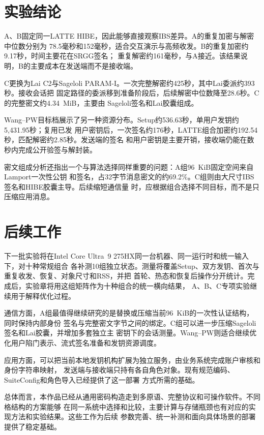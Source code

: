 \section{实验结论}

A、B固定同一LATTE HIBE，因此能够直接观察IBS差异。A的重复加密与解密中位数分别为
78.5毫秒和152毫秒，适合交互演示与高频收发。B的重复加密约9.17秒，时间主要花在SRGG签名；
重复解密约161毫秒，与A接近。该结果说明，B的主要成本在发送端而不是接收端。

C更换为Lai C2与Sageloli PARAM-I。一次完整解密约425秒，其中Lai委派约393秒。接收会话把
固定路径的委派移到准备阶段后，后续解密中位数降至28.6秒。C的完整密文约4.34~MiB，主要由
Sageloli签名和Lai胶囊组成。

Wang--PW目标档展示了另一种资源分布。Setup约536.63秒，单用户发钥约5,431.95秒；复用已发
用户密钥后，一次签名约176秒，LATTE组合加密约192.54秒，匹配解密约2.85秒。发送端的签名
和用户密钥是主要开销，接收端仍能在数秒内完成公开验签与解封装。

密文组成分析还指出一个与算法选择同样重要的问题：A组96~KiB固定空间来自Lamport一次性公钥
和签名，占32字节消息密文的约69.2\%。C组则由大尺寸IBS签名和HIBE胶囊主导。后续缩短通信量
时，应根据组合选择不同目标，而不是只压缩应用消息。

\section{后续工作}

下一批实验将在Intel Core Ultra~9 275HX同一台机器、同一运行时和统一输入下，对十种常规组合
各补测10组独立状态。测量将覆盖Setup、双方发钥、首次与重复收发、恢复、对象尺寸和RSS，并把
首轮、热态和恢复后操作分开统计。完成后，实验章将用这组矩阵作为十种组合的统一横向结果，
A、B、C专项实验继续用于解释优化过程。

通信方面，A组最值得继续研究的是替换或压缩当前96~KiB的一次性认证结构，同时保持内部身份
签名与完整密文字节之间的绑定。C组可以进一步压缩Sageloli签名和Lai胶囊，并增加多套独立主
密钥下的会话测量。Wang--PW则适合继续优化用户陷门表示、流式签名准备和发钥资源调度。

应用方面，可以把当前本地发钥机构扩展为独立服务，由业务系统完成账户审核和身份字符串映射，
发送端与接收端只持有各自角色对象。现有规范编码、SuiteConfig和角色导入已经提供了这一部署
方式所需的基础。

总体而言，本作品已经从通用密码构造走到多原语、完整协议和可操作软件。不同格结构的方案能够
在同一系统中选择和比较，主要计算与存储瓶颈也有对应的实现方法和实验结果。这些工作为后续
参数完善、统一补测和面向具体场景的部署提供了稳定基础。
